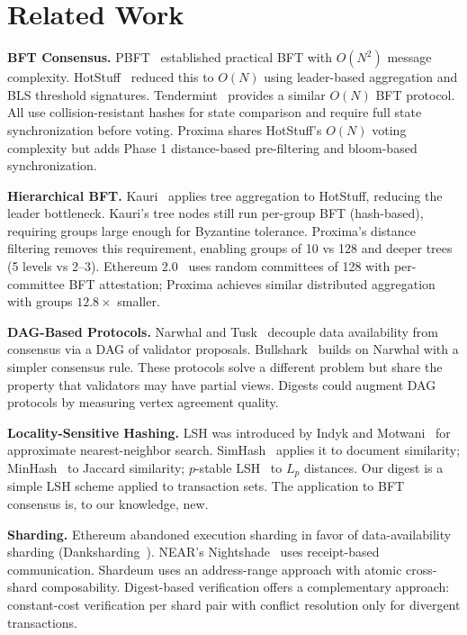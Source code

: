 \documentclass[conference]{IEEEtran}
\begin{document}
\section{Related Work}

\textbf{BFT Consensus.} PBFT~\cite{castro1999pbft} established practical BFT with $O(N^2)$ message complexity. HotStuff~\cite{yin2019hotstuff} reduced this to $O(N)$ using leader-based aggregation and BLS threshold signatures. Tendermint~\cite{buchman2016tendermint} provides a similar $O(N)$ BFT protocol. All use collision-resistant hashes for state comparison and require full state synchronization before voting. Proxima shares HotStuff's $O(N)$ voting complexity but adds Phase 1 distance-based pre-filtering and bloom-based synchronization.

\textbf{Hierarchical BFT.} Kauri~\cite{kauri} applies tree aggregation to HotStuff, reducing the leader bottleneck. Kauri's tree nodes still run per-group BFT (hash-based), requiring groups large enough for Byzantine tolerance. Proxima's distance filtering removes this requirement, enabling groups of 10 vs 128 and deeper trees (5 levels vs 2--3). Ethereum 2.0~\cite{eth2spec} uses random committees of 128 with per-committee BFT attestation; Proxima achieves similar distributed aggregation with groups $12.8\times$ smaller.

\textbf{DAG-Based Protocols.} Narwhal and Tusk~\cite{narwhal} decouple data availability from consensus via a DAG of validator proposals. Bullshark~\cite{bullshark} builds on Narwhal with a simpler consensus rule. These protocols solve a different problem but share the property that validators may have partial views. Digests could augment DAG protocols by measuring vertex agreement quality.

\textbf{Locality-Sensitive Hashing.} LSH was introduced by Indyk and Motwani~\cite{indyk1998lsh} for approximate nearest-neighbor search. SimHash~\cite{simhash} applies it to document similarity; MinHash~\cite{minhash} to Jaccard similarity; $p$-stable LSH~\cite{pstable} to $L_p$ distances. Our digest is a simple LSH scheme applied to transaction sets. The application to BFT consensus is, to our knowledge, new.

\textbf{Sharding.} Ethereum abandoned execution sharding in favor of data-availability sharding (Danksharding~\cite{danksharding}). NEAR's Nightshade~\cite{nightshade} uses receipt-based communication. Shardeum uses an address-range approach with atomic cross-shard composability. Digest-based verification offers a complementary approach: constant-cost verification per shard pair with conflict resolution only for divergent transactions.
\end{document}
